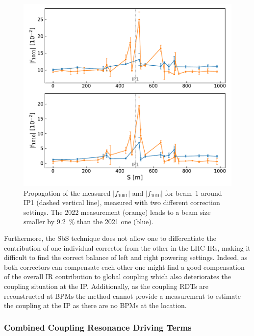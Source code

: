 \begin{figure}[!htb]
    \centering
    \includegraphics*[width=\columnwidth]{Figures/IR_Coupling_Correction/sbs_coupling_b1_ir1_compare_2021_2022_colin_delta_minus4.pdf}
    \caption{Propagation of the measured \(|f_{1001}|\) and \(|f_{1010}|\) for beam~\num{1} around IP\num{1} (dashed vertical line), measured with two different correction settings. The \num{2022} measurement (\textcolor{mplorange}{orange}) leads to a beam size smaller by \qty{9.2}{\percent} than the \num{2021} one (\textcolor{mplblue}{blue}).}
    \label{figure:beamtest_vs_2022_sbs_abs_f1001_ir1}
\end{figure}

Furthermore, the SbS technique does not allow one to differentiate the contribution of one individual corrector from the other in the LHC IRs, making it difficult to find the correct balance of left and right powering settings.
Indeed, as both correctors can compensate each other one might find a good compensation of the overall IR contribution to global coupling which also deteriorates the coupling situation at the IP.
Additionally, as the coupling RDTs are reconstructed at BPMs the method cannot provide a measurement to estimate the coupling at the IP as there are no BPMs at the location.

\subsubsection*{Combined Coupling Resonance Driving Terms}


